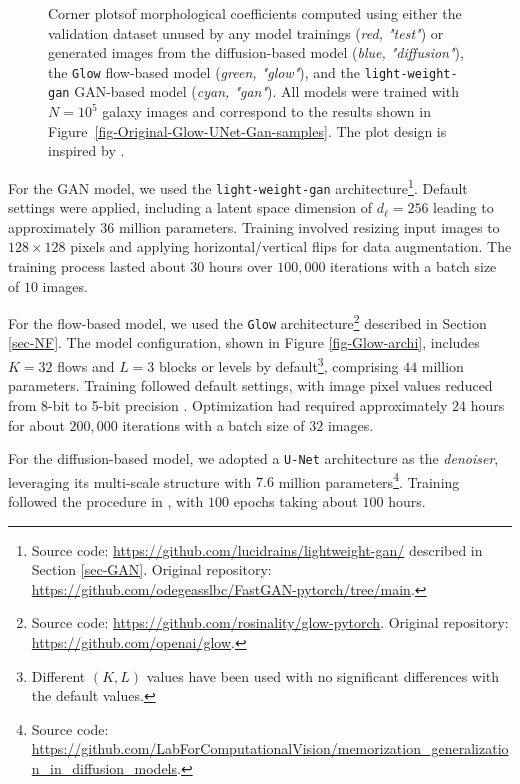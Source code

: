 \documentclass[fleqn,usenatbib]{mnras}
\begin{document}
\begin{figure}
	\caption{Corner plots\protect\footnotemark of morphological coefficients computed using either the validation dataset unused by any model trainings (\textit{red, "test"}) or generated images from the diffusion-based model (\textit{blue, "diffusion"}), the \texttt{Glow} flow-based model (\textit{green, "glow"}), and the \texttt{light-weight-gan} GAN-based model (\textit{cyan, "gan"}). All models were trained with $N = 10^5$ galaxy images and correspond to the results shown in Figure~\ref{fig-Original-Glow-UNet-Gan-samples}. The plot design is inspired by \protect\cite{HACKSTEIN2023100685}.}
	\label{fig-morpho-coeff}
\end{figure}


For the GAN model, we used the \texttt{light-weight-gan} architecture\footnote{Source code: \url{https://github.com/lucidrains/lightweight-gan/} described in Section \ref{sec-GAN}. Original repository: \url{https://github.com/odegeasslbc/FastGAN-pytorch/tree/main}.}. Default settings were applied, including a latent space dimension of $d_\ell=256$ leading to approximately $36$ million parameters. Training involved resizing input images to $128 \times 128$ pixels and applying horizontal/vertical flips for data augmentation. The training process lasted about $30$ hours over $100,000$ iterations with a batch size of $10$ images.

For the flow-based model, we used the \texttt{Glow} architecture\footnote{Source code: \url{https://github.com/rosinality/glow-pytorch}. Original repository: \url{https://github.com/openai/glow}.} described in Section \ref{sec-NF}. The model configuration, shown in Figure \ref{fig-Glow-archi}, includes $K=32$ flows and $L=3$ blocks or levels by default\footnote{Different $(K,L)$ values have been used with no significant differences with the default values.}, comprising $44$ million parameters. Training followed default settings, with image pixel values reduced from 8-bit to 5-bit precision \citep{Kingma2018}. Optimization had required approximately $24$ hours for about $200,000$ iterations with a batch size of $32$ images.

For the diffusion-based model, we adopted a \texttt{U-Net} architecture \citep{ronneberger2015u} as the \textit{denoiser}, leveraging its multi-scale structure with $7.6$ million parameters\footnote{Source code: \url{https://github.com/LabForComputationalVision/memorization_generalization_in_diffusion_models}.}. Training followed the procedure in \cite{kadkhodaie2024generalization}, with $100$ epochs taking about $100$ hours.
%
\end{document}
